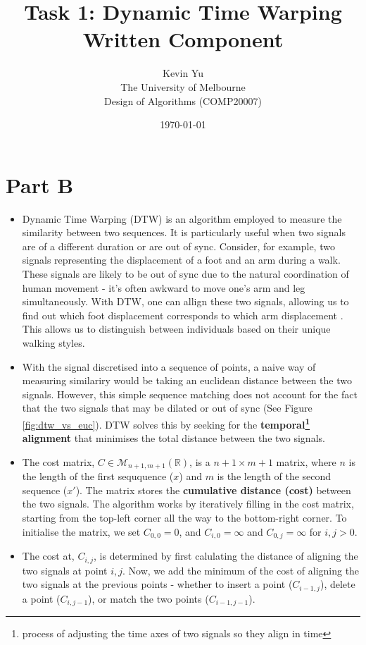 \documentclass[12pt]{article}
\title{Task 1: Dynamic Time Warping Written Component}
\author{Kevin Yu \\ The University of Melbourne \\ Design of Algorithms (COMP20007)}
\date{\today}
\begin{document}
\maketitle

\section{Part B} \label{sec:partB}
\begin{itemize}
    \item Dynamic Time Warping (DTW) is an algorithm employed to measure the similarity between two sequences. It is particularly useful when two signals are of a different duration or are out of sync. Consider, for example, two signals representing the displacement of a foot and an arm during a walk. These signals are likely to be out of sync due to the natural coordination of human movement - it's often awkward to move one's arm and leg simultaneously. With DTW, one can allign these two signals, allowing us to find out which foot displacement corresponds to which arm displacement \cite{ref1}. This allows us to distinguish between individuals based on their unique walking styles. 
    \item With the signal discretised into a sequence of points, a naive way of measuring similariry would be taking an euclidean distance between the two signals. However, this simple sequence matching does not account for the fact that the two signals that may be dilated or out of sync (See Figure \ref{fig:dtw_vs_euc}). DTW solves this by seeking for the \textbf{temporal\footnote{process of adjusting the time axes of two signals so they align in time} alignment} that minimises the total distance between the two signals. 
    \item The cost matrix, $C \in \mathcal{M}_{n + 1, m + 1} \left(\mathbb{R}\right)$, is a $n+1 \times m+1$ matrix, where $n$ is the length of the first seququence ($x$) and $m$ is the length of the second sequence ($x'$). The matrix stores the \textbf{cumulative distance (cost)} between the two signals. The algorithm works by iteratively filling in the cost matrix, starting from the top-left corner all the way to the bottom-right corner. To initialise the matrix, we set $C_{0, 0} = 0$, and $C_{i, 0} = \infty$ and $C_{0, j} = \infty$ for $i, j > 0$. 
    \item The cost at, $C_{i, j}$, is determined by first calulating the distance of aligning the two signals at point $i, j$. Now, we add the minimum of the cost of aligning the two signals at the previous points - whether to insert a point ($C_{i - 1, j}$), delete a point ($C_{i, j-1}$), or match the two points ($C_{i - 1, j - 1}$).
\end{itemize}
\end{document}
